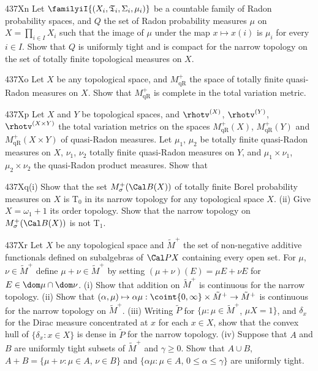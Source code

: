 {\sqheader 437Xn Let
$\familyiI{(X_i,\frak T_i,\Sigma_i,\mu_i)}$ be a countable family of Radon
probability spaces, and $Q$ the set of Radon probability measures $\mu$ on
$X=\prod_{i\in I}X_i$ such that the image of $\mu$ under the map
$x\mapsto x(i)$ is
$\mu_i$ for every $i\in I$.   Show that $Q$ is uniformly tight and is
compact for the narrow topology on the set of
totally finite topological measures on $X$.

\spheader 437Xo
Let $X$ be any topological space, and $M^+_{\text{qR}}$ the
space of totally finite quasi-Radon measures on $X$.   Show that
$M^+_{\text{qR}}$ is complete in the total variation metric.

\spheader 437Xp
Let $X$ and $Y$ be topological spaces, and $\rhotv^{(X)}$,
$\rhotv^{(Y)}$, $\rhotv^{(X\times Y)}$
the total variation metrics on the spaces
$M^+_{\text{qR}}(X)$, $M^+_{\text{qR}}(Y)$ and $M^+_{\text{qR}}(X\times Y)$
of quasi-Radon measures.   Let $\mu_1$, $\mu_2$ be totally finite
quasi-Radon measures
on $X$, $\nu_1$, $\nu_2$ totally finite quasi-Radon measures on $Y$, and
$\mu_1\times\nu_1$, $\mu_2\times\nu_2$ the quasi-Radon product measures.
Show that


\spheader 437Xq(i) Show that the set
$M^+_{\sigma}(\Cal B(X))$ of totally finite
Borel probability measures on $X$ is T$_0$ in its narrow topology for any
topological space $X$.
(ii) Give $X=\omega_1+1$ its order topology.
Show that the narrow topology on $M^+_{\sigma}(\Cal B(X))$ is not T$_1$.

\spheader 437Xr Let $X$ be any topological space and $\tilde M^+$ the
set of non-negative additive functionals defined on subalgebras of
$\Cal PX$ containing every open set.   For $\mu$,
$\nu\in\tilde M^+$ define $\mu+\nu\in\tilde M^+$ by setting
$(\mu+\nu)(E)=\mu E+\nu E$ for $E\in\dom\mu\cap\dom\nu$.   (i) Show that
addition on $\tilde M^+$ is continuous for the narrow topology.   (ii)
Show that $(\alpha,\mu)\mapsto\alpha\mu:
\coint{0,\infty}\times\tilde M^+\to \tilde M^+$ is continuous for the
narrow topology on $\tilde M^+$.   (iii) Writing $\tilde P$ for
$\{\mu:\mu\in\tilde M^+$, $\mu X=1\}$, and $\delta_x$ for the Dirac measure
concentrated at $x$ for each $x\in X$, show that the convex hull of
$\{\delta_x:x\in X\}$ is dense in $\tilde P$ for the narrow topology.
(iv) Suppose that $A$ and $B$
are uniformly tight subsets of $\tilde M^+$ and $\gamma\ge 0$.
Show that $A\cup B$, $A+B=\{\mu+\nu:\mu\in A$, $\nu\in B\}$ and
$\{\alpha\mu:\mu\in A$, $0\le\alpha\le\gamma\}$ are uniformly tight.

}
